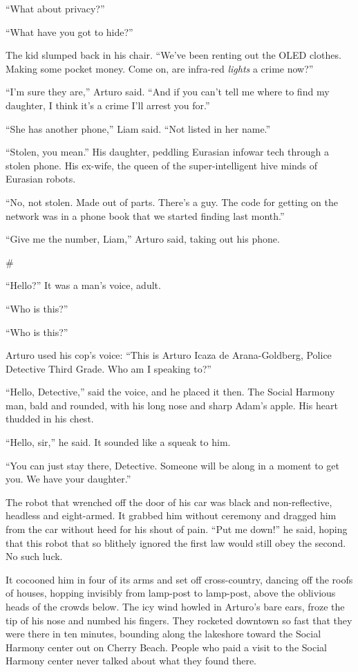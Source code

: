“What about privacy?”

“What have you got to hide?”

The kid slumped back in his chair. “We’ve been renting out the OLED
clothes. Making some pocket money. Come on, are infra-red
\emph{lights} a crime now?”

“I’m sure they are,” Arturo said. “And if you can’t tell me where
to find my daughter, I think it’s a crime I’ll arrest you for.”

“She has another phone,” Liam said. “Not listed in her name.”

“Stolen, you mean.” His daughter, peddling Eurasian infowar tech
through a stolen phone. His ex-wife, the queen of the
super-intelligent hive minds of Eurasian robots.

“No, not stolen. Made out of parts. There’s a guy. The code for
getting on the network was in a phone book that we started finding
last month.”

“Give me the number, Liam,” Arturo said, taking out his phone.

\#

“Hello?” It was a man’s voice, adult.

“Who is this?”

“Who is this?”

Arturo used his cop’s voice: “This is Arturo Icaza de
Arana-Goldberg, Police Detective Third Grade. Who am I speaking
to?”

“Hello, Detective,” said the voice, and he placed it then. The
Social Harmony man, bald and rounded, with his long nose and sharp
Adam’s apple. His heart thudded in his chest.

“Hello, sir,” he said. It sounded like a squeak to him.

“You can just stay there, Detective. Someone will be along in a
moment to get you. We have your daughter.”

The robot that wrenched off the door of his car was black and
non-reflective, headless and eight-armed. It grabbed him without
ceremony and dragged him from the car without heed for his shout of
pain. “Put me down!” he said, hoping that this robot that so
blithely ignored the first law would still obey the second. No such
luck.

It cocooned him in four of its arms and set off cross-country,
dancing off the roofs of houses, hopping invisibly from lamp-post
to lamp-post, above the oblivious heads of the crowds below. The
icy wind howled in Arturo’s bare ears, froze the tip of his nose
and numbed his fingers. They rocketed downtown so fast that they
were there in ten minutes, bounding along the lakeshore toward the
Social Harmony center out on Cherry Beach. People who paid a visit
to the Social Harmony center never talked about what they found
there.

